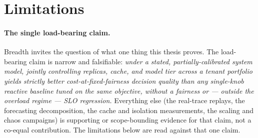 \section{Limitations}
\label{sec:disc-limits}

\paragraph{The single load-bearing claim.} Breadth invites the question of
what one thing this thesis proves. The load-bearing claim is narrow and
falsifiable: \emph{under a stated, partially-calibrated system model, jointly
controlling replicas, cache, and model tier across a tenant portfolio yields
strictly better cost-at-fixed-fairness decision quality than any single-knob
reactive baseline tuned on the same objective, without a fairness or ---
outside the overload regime --- SLO regression.} Everything else (the
real-trace replays, the forecasting decomposition, the cache and isolation
measurements, the scaling and chaos campaigns) is supporting or scope-bounding
evidence for that claim, not a co-equal contribution. The limitations below
are read against that one claim.

